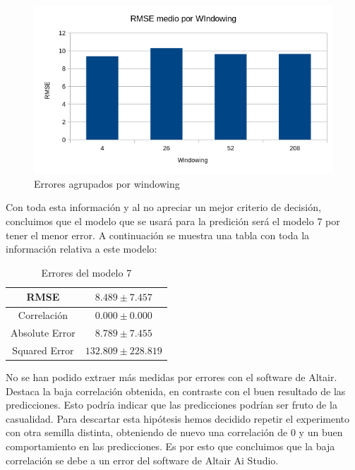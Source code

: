 \documentclass[12pt]{report} %
\begin{document}
\begin{figure}[H]
    \includegraphics[width=\linewidth]{RMSE-windowing.png}
    \caption {\small Errores agrupados por windowing}
\end{figure}

Con toda esta información y al no apreciar un mejor criterio de decisión, concluimos que el modelo que se usará para la predición será el modelo 7 por tener el menor error. A continuación se muestra una tabla con toda la información relativa a este modelo:

\begin{table}[H]
\begin{center}
\begin{tabular}{|c|c|}
    \hline
    RMSE                        & $8.489\pm 7.457$\\ 
    \hline
    Correlación                 & $0.000\pm 0.000$\\
    \hline
    Absolute Error              & $8.789\pm7.455$\\
    \hline
    Squared Error               & $132.809\pm 228.819$\\ 
    \hline
\end{tabular}
\caption{Errores del modelo 7}
\end{center}
\end{table}

No se han podido extraer más medidas por errores con el software de Altair. Destaca la baja correlación obtenida, en contraste con el buen resultado de las predicciones. Esto podría indicar que las predicciones podrían ser fruto de la casualidad. Para descartar esta hipótesis hemos decidido repetir el experimento con otra semilla distinta, obteniendo de nuevo una correlación de 0 y un buen comportamiento en las predicciones. Es por esto que concluimos que la baja correlación se debe a un error del software de Altair Ai Studio.
\end{document}
